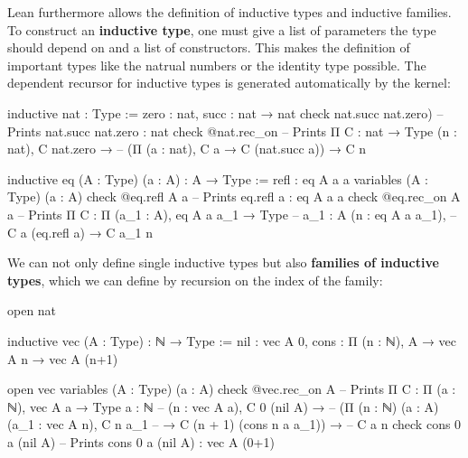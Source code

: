 Lean furthermore allows the definition of inductive types and inductive
families.
To construct an \textbf{inductive type}, one must give a list of parameters the type should
depend on and a list of constructors.
This makes the definition of important types like the natrual numbers or the identity
type possible.
The dependent recursor for inductive types is generated automatically by the kernel:
\begin{leancode}
inductive nat : Type :=
  zero : nat,
  succ : nat → nat
check nat.succ nat.zero) -- Prints nat.succ nat.zero : nat
check @nat.rec_on -- Prints Π {C : nat → Type} (n : nat), C nat.zero →
                  --        (Π (a : nat), C a → C (nat.succ a)) → C n
\end{leancode}

\begin{leancode}
inductive eq (A : Type) (a : A) : A → Type :=
  refl : eq A a a
variables (A : Type) (a : A)
check @eq.refl A a -- Prints eq.refl a : eq A a a
check @eq.rec_on A a -- Prints Π {C : Π (a_1 : A), eq A a a_1 → Type}
                     --        {a_1 : A} (n : eq A a a_1),
                     --        C a (eq.refl a) → C a_1 n
\end{leancode}

We can not only define single inductive types but also \textbf{families of
inductive types}, which we can define by recursion on the index of the family:
\begin{leancode}
open nat

inductive vec (A : Type) : ℕ → Type :=
  nil : vec A 0,
  cons : Π (n : ℕ), A → vec A n → vec A (n+1)

open vec
variables (A : Type) (a : A)
check @vec.rec_on A -- Prints Π {C : Π (a : ℕ), vec A a → Type} {a : ℕ} 
                    --        (n : vec A a), C 0 (nil A) →
                    --        (Π (n : ℕ) (a : A) (a_1 : vec A n), C n a_1
                    --          → C (n + 1) (cons n a a_1)) →
                    --        C a n
check cons 0 a (nil A) -- Prints cons 0 a (nil A) : vec A (0+1)
\end{leancode}

